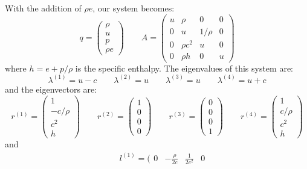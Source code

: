 \documentclass[11pt]{article}
\begin{document}
\begin{itemize}
With the addition of $\rho e$, our system becomes:
\begin{equation}
q = \left ( \begin{array}{c} \rho \\ u \\ p \\ \rho e \end{array} \right )
%
\qquad
%
A = \left ( \begin{array}{cccc} u & \rho     & 0      & 0 \\
                                0 & u        & 1/\rho & 0 \\
                                0 & \rho c^2 & u      & 0 \\
                                0 & \rho h   & 0      & u 
            \end{array} \right )
\end{equation}
where $h = e + p/\rho$ is the specific enthalpy.  The eigenvalues of this 
system are:
\begin{equation}
\lambda^{(1)} = u - c \qquad 
\lambda^{(2)} = u  \qquad 
\lambda^{(3)} = u  \qquad 
\lambda^{(4)} = u + c 
\end{equation}
and the eigenvectors are:
\begin{equation}
r^{(1)} = \left ( \begin{array}{c} 1 \\ -c/\rho \\ c^2 \\ h \end{array} \right )
\qquad
r^{(2)} = \left ( \begin{array}{c} 1 \\ 0 \\ 0 \\ 0 \end{array} \right )
\qquad
r^{(3)} = \left ( \begin{array}{c} 0 \\ 0 \\ 0 \\ 1 \end{array} \right )
\qquad
r^{(4)} = \left ( \begin{array}{c} 1 \\ c/\rho \\ c^2 \\ h \end{array} \right )
\end{equation}
and
\begin{eqnarray}
&&
l^{(1)} = ( \begin{array}{cccc} 0 & -\frac{\rho}{2c} & \frac{1}{2c^2} & 0 

\end{array}
\end{eqnarray}
\end{itemize}
\end{document}
